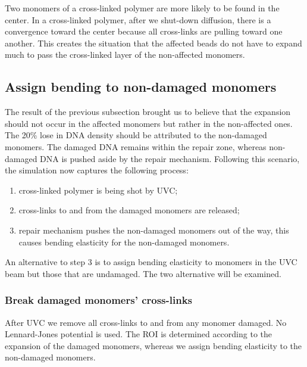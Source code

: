 \documentclass[12pt]{report}
\begin{document}
	  	Two monomers of a cross-linked polymer are more likely to be found in the center. In a cross-linked polymer, after we shut-down diffusion, there is a convergence toward the center because all cross-links are pulling toward one another. This creates the situation that the affected beads do not have to expand much to pass the cross-linked layer of the non-affected monomers. 
	
	\subsection{Assign bending to non-damaged monomers}
		
		The result of the previous subsection brought us to believe that the expansion should not occur in the affected monomers but rather in the non-affected ones. The 20\% lose in DNA density should be attributed to the non-damaged monomers. The damaged DNA remains within the repair zone, whereas non-damaged DNA is pushed aside by the repair mechanism. Following this scenario, the simulation now captures the following process:
		\begin{enumerate}
			\item cross-linked polymer is being shot by UVC;
			\item cross-links to and from the damaged monomers are released;
			\item repair mechanism pushes the non-damaged monomers out of the way, this causes bending elasticity for the non-damaged monomers.
		\end{enumerate}
		
		An alternative to step 3 is to assign bending elasticity to monomers in the UVC beam but those that are undamaged. The two alternative will be examined.
		
	\subsubsection{Break damaged monomers' cross-links}
     After UVC we remove all cross-links to and from any monomer damaged. No Lennard-Jones potential is used. The ROI is determined according to the expansion of the damaged monomers, whereas we assign bending elasticity to the non-damaged monomers. 
     
\end{document}
